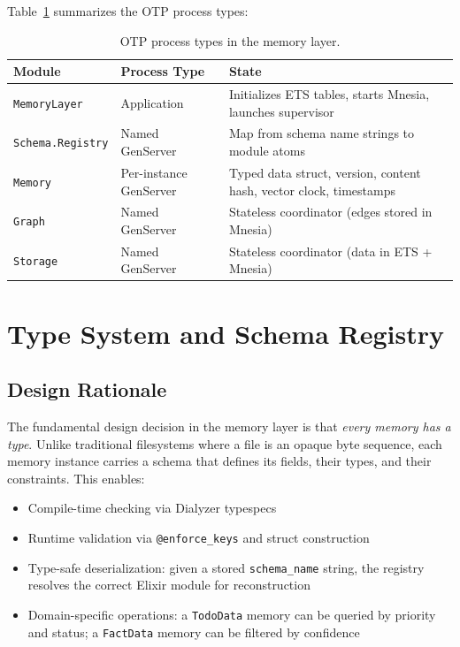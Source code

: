 \documentclass[12pt,a4paper]{article}
\theoremstyle{definition}
\begin{document}
Table~\ref{tab:module-summary} summarizes the OTP process types:

\begin{table}[H]
\centering
\caption{OTP process types in the memory layer.}
\label{tab:module-summary}
\begin{tabularx}{\textwidth}{llX}
\toprule
\textbf{Module} & \textbf{Process Type} & \textbf{State} \\
\midrule
\texttt{MemoryLayer} & Application & Initializes ETS tables, starts Mnesia, launches supervisor \\
\texttt{Schema.Registry} & Named GenServer & Map from schema name strings to module atoms \\
\texttt{Memory} & Per-instance GenServer & Typed data struct, version, content hash, vector clock, timestamps \\
\texttt{Graph} & Named GenServer & Stateless coordinator (edges stored in Mnesia) \\
\texttt{Storage} & Named GenServer & Stateless coordinator (data in ETS + Mnesia) \\
\bottomrule
\end{tabularx}
\end{table}

\section{Type System and Schema Registry}\label{sec:types}

\subsection{Design Rationale}\label{subsec:type-rationale}

The fundamental design decision in the memory layer is that \emph{every memory has a type}.
Unlike traditional filesystems where a file is an opaque byte sequence, each memory instance carries a schema that defines its fields, their types, and their constraints.
This enables:

\begin{itemize}
  \item Compile-time checking via Dialyzer typespecs
  \item Runtime validation via \texttt{@enforce\_keys} and struct construction
  \item Type-safe deserialization: given a stored \texttt{schema\_name} string, the registry resolves the correct Elixir module for reconstruction
  \item Domain-specific operations: a \texttt{TodoData} memory can be queried by priority and status; a \texttt{FactData} memory can be filtered by confidence
\end{itemize}
\end{document}
